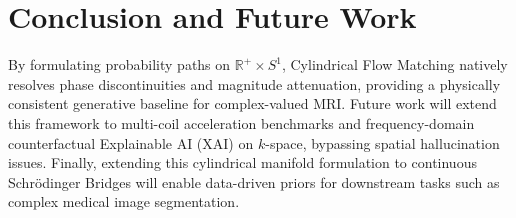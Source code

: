 \section{Conclusion and Future Work}
By formulating probability paths on $\mathbb{R}^+ \times S^1$, Cylindrical Flow Matching natively resolves phase discontinuities and magnitude attenuation, providing a physically consistent generative baseline for complex-valued MRI. Future work will extend this framework to multi-coil acceleration benchmarks and frequency-domain counterfactual Explainable AI (XAI) on $k$-space, bypassing spatial hallucination issues. Finally, extending this cylindrical manifold formulation to continuous Schr{\"o}dinger Bridges will enable data-driven priors for downstream tasks such as complex medical image segmentation.
